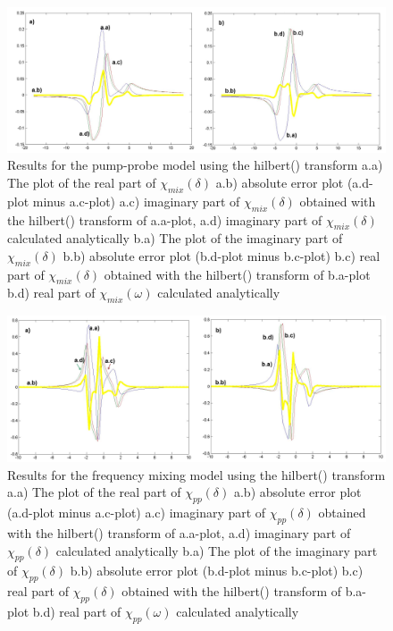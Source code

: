 \documentclass[12pt,twoside,a4paper]{article}
\numberwithin{equation}{subsection}
\numberwithin{figure}{subsection}
\begin{document}
\begin{figure} 
  \includegraphics[width=150mm]{img/hilb_pnp.png}
  \caption{Results for the pump-probe model using the hilbert() transform
     a.a) The plot of the real part of ${\chi_{mix}}(\delta )$
     a.b) absolute error plot (a.d-plot minus a.c-plot)
     a.c) imaginary part of ${\chi_{mix}}(\delta )$ obtained with the hilbert() transform of a.a-plot, 
     a.d) imaginary part of ${\chi_{mix}}(\delta )$ calculated analytically 
     b.a) The plot of the imaginary part of ${\chi_{mix}}(\delta )$ 
     b.b) absolute error plot (b.d-plot minus b.c-plot)
     b.c) real part of ${\chi_{mix}}(\delta )$ obtained with the hilbert() transform of b.a-plot  
     b.d) real part of $\chi_{mix} (\omega )$ calculated analytically 
     \label{fig:hilb_pnp}
     }
\end{figure}

\begin{figure} 
  \includegraphics[width=150mm]{img/hilb_fmix.png}
  \caption{Results for the frequency mixing model using the hilbert() transform
     a.a) The plot of the real part of ${\chi_{pp}}(\delta )$
     a.b) absolute error plot (a.d-plot minus a.c-plot)
     a.c) imaginary part of ${\chi_{pp}}(\delta )$ obtained with the hilbert() transform of a.a-plot, 
     a.d) imaginary part of ${\chi_{pp}}(\delta )$ calculated analytically 
     b.a) The plot of the imaginary part of ${\chi_{pp}}(\delta )$ 
     b.b) absolute error plot (b.d-plot minus b.c-plot)
     b.c) real part of ${\chi_{pp}}(\delta )$ obtained with the hilbert() transform of b.a-plot 
     b.d) real part of $\chi_{pp} (\omega )$ calculated analytically 
     \label{fig:hilb_fmix}
     }
\end{figure} 
\end{document}
